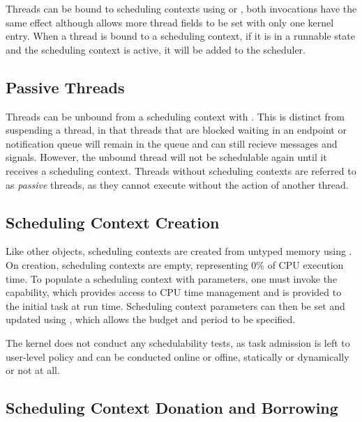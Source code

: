 Threads can be bound to scheduling contexts using  or 
, both invocations have the same effect although  allows more thread fields to be set with only one kernel entry. 
When a thread is bound to a scheduling context, if it is in a runnable state and the scheduling context is active, it will be added to the scheduler.

\subsection{Passive Threads}
\label{sec:passive}

Threads can be unbound from a scheduling context with . 
This is distinct from suspending a thread, in that threads that are blocked waiting in an endpoint or notification queue will remain 
in the queue and can still recieve messages and signals. 
However, the unbound thread will not be schedulable again until it receives a scheduling context.
Threads without scheduling contexts are referred to as \emph{passive} threads, as they cannot execute without the action of another thread. 

\subsection{Scheduling Context Creation}
\label{sec:sc_creation}

Like other objects, scheduling contexts are created from untyped memory using .
On creation, scheduling contexts are empty, representing 0\% of CPU execution time.
To populate a scheduling context with parameters, one must invoke the  capability, which provides access to CPU time management and is provided to the initial task at run time.
Scheduling context parameters can then be set and updated using , which allows the budget and period to be specified.

The kernel does not conduct any schedulability tests, as task admission is left to user-level policy and can be conducted online or offine, statically or dynamically or not at all. 

\subsection{Scheduling Context Donation and Borrowing}

